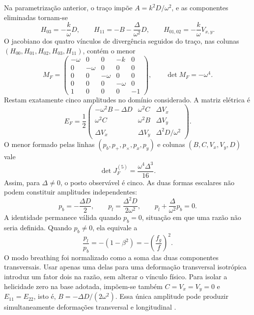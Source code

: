 Na parametrização anterior, o traço impõe
\(A=k^2D/\omega^2\), e as componentes eliminadas tornam-se
\begin{equation}
 H_{03}=-\frac{k}{\omega}D,
 \qquad H_{11}=-B-\frac{\Delta}{\omega^2}D,
 \qquad H_{01,02}=-\frac{k}{\omega}V_{x,y}.
 \label{eq:fund-fp-solucao}
\end{equation}
O jacobiano dos quatro vínculos de divergência seguidos do traço,
nas colunas \((H_{00},H_{01},H_{02},H_{03},H_{11})\), contém o menor
\begin{equation}
 M_F=\begin{pmatrix}
 -\omega&0&0&-k&0\\
 0&-\omega&0&0&0\\
 0&0&-\omega&0&0\\
 0&0&0&-\omega&0\\
 1&0&0&0&-1
 \end{pmatrix},
 \qquad\det M_F=-\omega^4.
 \label{eq:fund-menor-fp}
\end{equation}
Restam exatamente cinco amplitudes no domínio considerado. A matriz
elétrica é
\begin{equation}
 E_F=\frac12\begin{pmatrix}
 -\omega^2B-\Delta D&\omega^2C&\Delta V_x\\
 \omega^2C&\omega^2B&\Delta V_y\\
 \Delta V_x&\Delta V_y&\Delta^2D/\omega^2
 \end{pmatrix}.
 \label{eq:fund-eletrica-fp}
\end{equation}
O menor formado pelas linhas \((p_b,p_+,p_\times,p_x,p_y)\) e
colunas \((B,C,V_x,V_y,D)\) vale
\begin{equation}
 \det J_F^{(5)}=\frac{\omega^4\Delta^3}{16}.
 \label{eq:fund-posto-fp}
\end{equation}
Assim, para \(\Delta\ne0\), o posto observável é cinco. As duas
formas escalares não podem constituir amplitudes independentes:
\begin{equation}
 p_b=-\frac{\Delta D}{2},\qquad
 p_l=\frac{\Delta^2D}{2\omega^2},\qquad
 p_l+\frac{\Delta}{\omega^2}p_b=0.
 \label{eq:fund-identidade-escalar}
\end{equation}
A identidade permanece válida quando \(p_b=0\), situação em que
uma razão não seria definida. Quando \(p_b\ne0\), ela equivale a
\begin{equation}
 \boxed{\frac{p_l}{p_b}=-(1-\beta^2)=-\left(\frac{f_g}{f}\right)^2.}
 \label{eq:fund-razao-escalar}
\end{equation}
O modo breathing foi normalizado como a soma das duas componentes
transversais. Usar apenas uma delas para uma deformação transversal
isotrópica introduz um fator dois na razão, sem alterar o vínculo
físico. Para isolar a helicidade zero na base adotada, impõem-se também
\(C=V_x=V_y=0\) e \(E_{11}=E_{22}\), isto é,
\(B=-\Delta D/(2\omega^2)\). Essa única amplitude pode produzir
simultaneamente deformações transversal e longitudinal
\autocite{liang2021,bernardo2024}.

